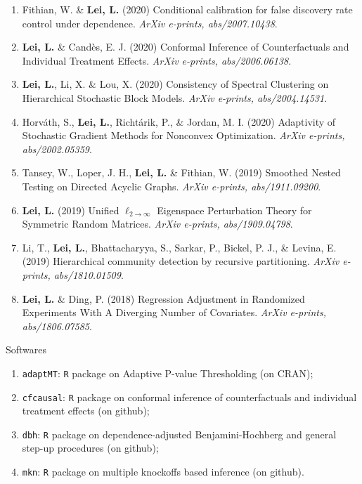 \documentclass{article}
\begin{document}
\begin{enumerate}
\item Fithian, W. \& \textbf{Lei, L.} (2020) Conditional calibration for false discovery rate control under dependence. \emph{ArXiv e-prints, abs/2007.10438}.
\item \textbf{Lei, L.} \& Cand\`{e}s, E. J. (2020) Conformal Inference of Counterfactuals and Individual Treatment Effects. \emph{ArXiv e-prints, abs/2006.06138}.
\item \textbf{Lei, L.}, Li, X. \& Lou, X. (2020) Consistency of Spectral Clustering on Hierarchical Stochastic Block Models. \emph{ArXiv e-prints, abs/2004.14531}.
\item Horv\'{a}th, S., \textbf{Lei, L.}, Richt\'{a}rik, P., \& Jordan, M. I. (2020) Adaptivity of Stochastic Gradient Methods for Nonconvex Optimization. \emph{ArXiv e-prints, abs/2002.05359}.
\item Tansey, W., Loper, J. H., \textbf{Lei, L.} \& Fithian, W. (2019) Smoothed Nested Testing on Directed Acyclic Graphs. \emph{ArXiv e-prints, abs/1911.09200}.
\item \textbf{Lei, L.} (2019) Unified $\ell_{2\rightarrow\infty}$ Eigenspace Perturbation Theory for Symmetric Random Matrices. \emph{ArXiv e-prints, abs/1909.04798}.
\item Li, T., \textbf{Lei, L.}, Bhattacharyya, S., Sarkar, P., Bickel, P. J., \& Levina, E. (2019) Hierarchical community detection by recursive partitioning. \emph{ArXiv e-prints, abs/1810.01509}.
\item \textbf{Lei, L.} \& Ding, P. (2018) Regression Adjustment in Randomized Experiments With A Diverging Number of Covariates. \emph{ArXiv e-prints, abs/1806.07585}.
\end{enumerate}

\begin{large}
\noindent Softwares 
\end{large}

\begin{enumerate}
\item \texttt{adaptMT}: \texttt{R} package on Adaptive P-value Thresholding (on CRAN);
\item \texttt{cfcausal}: \texttt{R} package on conformal inference of counterfactuals and individual treatment effects (on github);
\item \texttt{dbh}: \texttt{R} package on dependence-adjusted Benjamini-Hochberg and general step-up procedures (on github);
\item \texttt{mkn}: \texttt{R} package on multiple knockoffs based inference (on github).
\end{enumerate}
\end{document}
